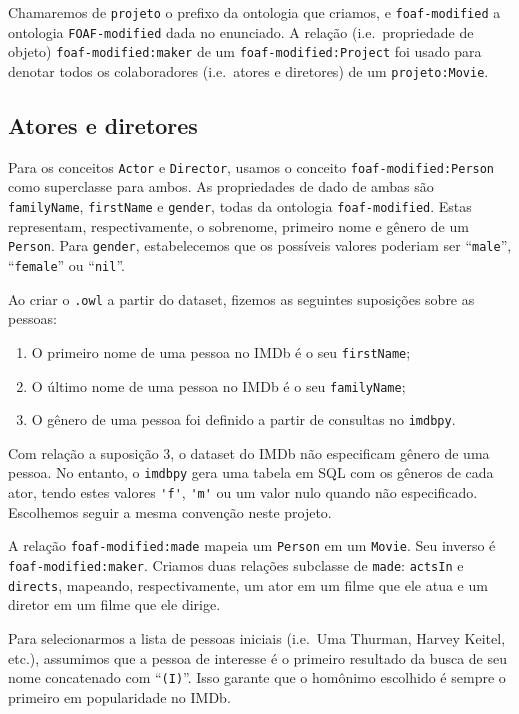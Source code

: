 \documentclass{article}
\newcommand{\code}[1]{\lstinline[mathescape=true]{#1}}
\begin{document}
Chamaremos de \code{projeto} o prefixo da ontologia que criamos, e \code{foaf-modified} a ontologia
\code{FOAF-modified} dada no enunciado. A relação (i.e.\ propriedade de objeto)
\code{foaf-modified:maker} de um \code{foaf-modified:Project} foi usado para denotar todos os
colaboradores (i.e.\ atores e diretores) de um \code{projeto:Movie}.

\subsection{Atores e diretores}

Para os conceitos \code{Actor} e \code{Director}, usamos o conceito \code{foaf-modified:Person}
como superclasse para ambos. As propriedades de dado de ambas são \code{familyName},
\code{firstName} e \code{gender}, todas da ontologia \code{foaf-modified}. Estas representam,
respectivamente, o sobrenome, primeiro nome e gênero de um \code{Person}. Para \code{gender},
estabelecemos que os possíveis valores poderiam ser ``\code{male}'', ``\code{female}'' ou
``\code{nil}''.

Ao criar o \code{.owl} a partir do dataset, fizemos as seguintes suposições sobre as pessoas:

\begin{enumerate}
  \item O primeiro nome de uma pessoa no IMDb é o seu \code{firstName};
  \item O último nome de uma pessoa no IMDb é o seu \code{familyName};
  \item O gênero de uma pessoa foi definido a partir de consultas no \code{imdbpy}.
\end{enumerate}

Com relação a suposição 3, o dataset do IMDb não especificam gênero de uma pessoa. No entanto, o
\code{imdbpy} gera uma tabela em SQL com os gêneros de cada ator, tendo estes valores \code{'f'},
\code{'m'} ou um valor nulo quando não especificado. Escolhemos seguir a mesma convenção neste
projeto.

A relação \code{foaf-modified:made} mapeia um \code{Person} em um \code{Movie}. Seu inverso é
\code{foaf-modified:maker}. Criamos duas relações subclasse de \code{made}: \code{actsIn} e
\code{directs}, mapeando, respectivamente, um ator em um filme que ele atua e um diretor em um
filme que ele dirige.

Para selecionarmos a lista de pessoas iniciais (i.e.\ Uma Thurman, Harvey Keitel, etc.), assumimos
que a pessoa de interesse é o primeiro resultado da busca de seu nome concatenado com
``\code{(I)}''. Isso garante que o homônimo escolhido é sempre o primeiro em popularidade no IMDb.
\end{document}
